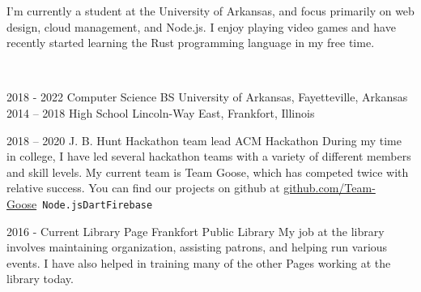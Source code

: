 \documentclass[9pt]{developercv} %
\begin{document}
	\begin{minipage}[t]{0.35\textwidth}
		\vspace{-\baselineskip} %

		I'm currently a student at the University of Arkansas, and focus primarily on web design, cloud management, and Node.js. I enjoy playing video games and have recently started learning the Rust programming language in my free time.

	\end{minipage}
	\hfill %
	\begin{minipage}[t]{0.6\textwidth} %
		\vspace{-\baselineskip} %
		\vspace{.2cm}\\
	\end{minipage}

\vspace{-6pt}



\begin{entrylist}
	\entry
		{2018 - 2022}
		{Computer Science BS}
		{}
		{University of Arkansas, Fayetteville, Arkansas}
	\entry
		{2014 -- 2018}
		{High School}
		{}
		{Lincoln-Way East, Frankfort, Illinois}
\end{entrylist}


\begin{entrylist}
	\entry
		{2018 -- 2020}
		{J. B. Hunt Hackathon team lead}
		{ACM Hackathon}
		{During my time in college, I have led several hackathon teams with a variety of different members and skill levels. My current team is Team Goose, which has competed twice with relative success. You can find our projects on github at \href{https://github.com/Team-Goose}{github.com/Team-Goose}\
		\newline\texttt{Node.js}\slashsep\texttt{Dart}\slashsep\texttt{Firebase}}
\end{entrylist}

\begin{entrylist}
	\entry
		{2016 - Current}
		{Library Page}
		{Frankfort Public Library}
		{My job at the library involves maintaining organization, assisting patrons, and helping run various events. I have also helped in training many of the other Pages working at the library today.}\
\end{entrylist}
\end{document}
